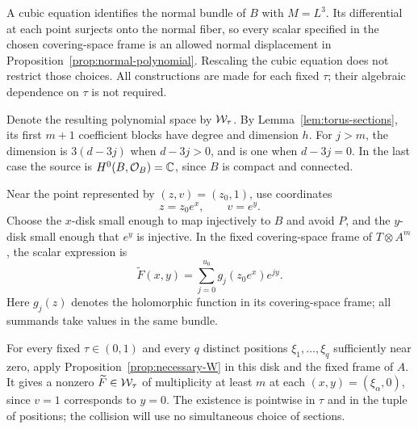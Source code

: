 A cubic equation identifies the normal bundle of $B$ with $M=L^3$.
Its differential at each point surjects onto the normal fiber, so
every scalar specified in the chosen covering-space frame is an
allowed normal displacement in
Proposition~\ref{prop:normal-polynomial}. Rescaling the cubic equation
does not restrict those choices. All constructions are made for each
fixed $\tau$; their algebraic dependence on $\tau$ is not required.

Denote the resulting polynomial space by $\mathcal W_\tau$. By
Lemma~\ref{lem:torus-sections}, its first $m+1$ coefficient blocks
have degree and dimension $h$. For $j>m$, the dimension is
$3(d-3j)$ when $d-3j>0$, and is one when $d-3j=0$. In the last
case the source is $H^0(B,\mathcal O_B)=\mathbb C$, since $B$ is compact
and connected.

Near the point represented by $(z,v)=(z_0,1)$, use coordinates
\begin{equation}
 z=z_0e^x,\qquad v=e^y.
\label{eq:local-chart}
\end{equation}
Choose the $x$-disk small enough to map injectively to $B$ and avoid
$P$, and the $y$-disk small enough that $e^y$ is injective. In the
fixed covering-space frame of $T\otimes A^m$, the scalar expression
is
\[
 \widetilde F(x,y)=\sum_{j=0}^{u_0}g_j(z_0e^x)e^{jy}.
\]
Here $g_j(z)$ denotes the holomorphic function in its covering-space
frame; all summands take values in the same bundle.

For every fixed $\tau\in(0,1)$ and every $q$ distinct positions
$\xi_1,\ldots,\xi_q$ sufficiently near zero, apply
Proposition~\ref{prop:necessary-W} in this disk and the fixed frame
of $A$. It gives a nonzero $\widetilde F\in\mathcal W_\tau$ of multiplicity
at least $m$ at each $(x,y)=(\xi_\alpha,0)$, since $v=1$ corresponds
to $y=0$. The existence is pointwise in $\tau$ and in the tuple of
positions; the collision will use no simultaneous choice of sections.
